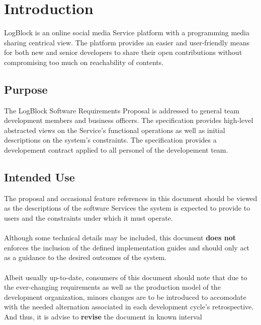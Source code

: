 \chapter{Introduction}

LogBlock is an online social media Service platform with a programming media sharing centrical view. The platform provides an easier and user-friendly means 
for both new and senior developers to share their open contributions without compromising too much on reachability of contents.

    \section{Purpose}
    The LogBlock Software Requirements Proposal is addressed to general team development members and business officers. 
    The specification provides high-level abstracted views on the Service's functional operations as well as initial descriptions on the system's constraints.
    The specification provides a developement contract applied to all personel of the developement team.

    \section{Intended Use}
    The proposal and occasional feature references in this document should be viewed as
    the descriptions of the software Services the system is expected to provide to  users and the constraints
    under which it must operate.
    \\\\
    Although some technical details may be included, this document \textbf{does not} enforces the inclusion of the defined implementation guides and should only act as a guidance
    to the desired outcomes of the system.
    \\\\
    Albeit usually up-to-date, consumers of this document should note that due to the ever-changing requirements as 
    well as the production model of the development organization, minors changes are to be introduced to accomodate with the needed alternation associated in each 
    development cycle's retrospective. And thus, it is advise to \textbf{revise} the document in known interval

